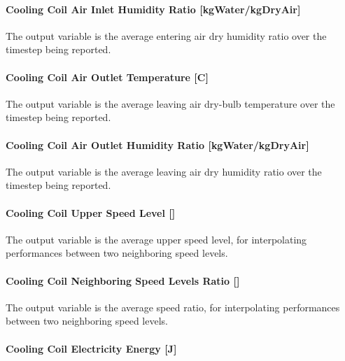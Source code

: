 \paragraph{Cooling Coil Air Inlet Humidity Ratio {[}kgWater/kgDryAir{]}}\label{cooling-coil-air-inlet-humidity-ratio-kgwaterkgdryair}

The output variable is the average entering air dry humidity ratio over the timestep being reported.

\paragraph{Cooling Coil Air Outlet Temperature {[}C{]}}\label{cooling-coil-air-outlet-temperature-c}

The output variable is the average leaving air dry-bulb temperature over the timestep being reported.

\paragraph{Cooling Coil Air Outlet Humidity Ratio {[}kgWater/kgDryAir{]}}\label{cooling-coil-air-outlet-humidity-ratio-kgwaterkgdryair}

The output variable is the average leaving air dry humidity ratio over the timestep being reported.

\paragraph{Cooling Coil Upper Speed Level {[]}}\label{cooling-coil-upper-speed-level}

The output variable is the average upper speed level, for interpolating performances between two neighboring speed levels.

\paragraph{Cooling Coil Neighboring Speed Levels Ratio {[]}}\label{cooling-coil-neighboring-speed-levels-ratio}

The output variable is the average speed ratio, for interpolating performances between two neighboring speed levels.

\paragraph{Cooling Coil Electricity Energy {[}J{]}}\label{cooling-coil-electric-energy-j-1}

